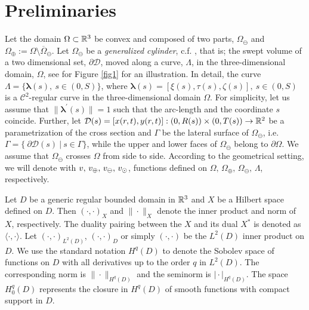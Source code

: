 \documentclass[r]{siamart171218}
\begin{document}
\section{Preliminaries}\label{sec:setting}

Let the domain $\Omega\subset \mathbb{R}^3 $ be convex and composed of two parts, 
$\Omega_{\ominus}$ and $\Omega_{\oplus}:=\Omega\setminus\overline{\Omega}_{\ominus}$. 
Let 
$\Omega_{\ominus}$ be a \emph{generalized cylinder}, c.f.  \cite{MR1940257}, 
that is; the swept volume of a two dimensional set, $\partial\mathcal{D}$, moved along a curve, $\Lambda$, in the three-dimensional domain, $\Omega$, see for Figure \ref{fig1} for an illustration. 
In detail, the curve 
$\Lambda = \{\boldsymbol \lambda(s), \ s\in(0,S)\}$,  where 
$\boldsymbol \lambda(s) = [\xi(s), \tau(s), \zeta(s)], \ s\in(0,S)$ is a $\mathcal{C}^2$-regular curve in the three-dimensional domain $\Omega$.
For simplicity, let us assume that $\|\boldsymbol \lambda^\prime(s)\|=1$ such that the arc-length and the coordinate $s$ coincide.
Further, let $\mathcal{D}(s) = [x(r,t),y(r,t)]: (0,R(s))\times(0,T(s)) \rightarrow \mathbb{R}^2$ be a parametrization of the cross section
and $\Gamma$ be the lateral surface of $\Omega_{\ominus}$, i.e.
$\Gamma=\{ \ \partial \mathcal{D}(s) \  | \ s \in \Gamma\}$,
while the upper and lower faces of $\Omega_{\ominus}$ belong to $\partial\Omega$. 
We assume that $\Omega_{\ominus}$ crosses $\Omega$ from side to side.
According to the geometrical setting, we will denote with $v,\,v_\oplus,\,v_\ominus,\,v_{\odot}$,
functions defined on $\Omega,\,\Omega_{\oplus},\,\Omega_{\ominus},\,\Lambda$, respectively.



Let $D$ be a generic regular bounded domain in $\mathbb{R}^3$ and $X$ be a Hilbert space defined on $D$. Then  $(\cdot,\cdot)_X$ and $\|\cdot\|_X$ denote the inner product and norm of $X$, respectively.
The duality pairing between the $X$ and its dual $X^*$ is denoted as $\langle\cdot,\cdot\rangle$.
Let $(\cdot,\cdot)_{L^2(D)}$,  $(\cdot,\cdot)_D$ or simply $(\cdot,\cdot)$ be the $L^2(D)$ inner product on $D$.
We use the standard notation $H^q(D)$ to denote the Sobolev space of functions on $D$ with all derivatives up to the order $q$ in $L^2(D)$.
The corresponding norm is $\|\cdot\|_{H^q(D)}$ and the seminorm is $\vert\cdot\vert_{H^q(D)}$.
The space $H^q_0(D)$ represents the closure in $H^q(D)$ of smooth functions with compact support in $D$.
\end{document}

